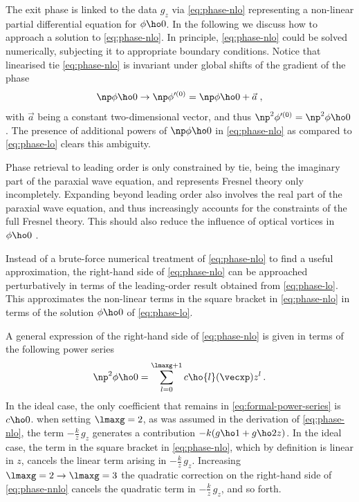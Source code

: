 \documentclass[
twoside,
openright,
titlepage,
numbers=noenddot,
headinclude,
fleqn,
a4paper,
footinclude=true,
cleardoublepage=empty,
abstractoff,
BCOR=5mm,
paper=a4,
fontsize=11pt,
british,ngerman,american,
]{scrreprt}
\begin{document}
The exit phase is linked to the data $g_z$ via \cref{eq:phase-nlo}
representing a non-linear partial differential equation for
$\phi\ho0$.  In the following we discuss how to approach a solution to
\cref{eq:phase-nlo}.  In principle, \cref{eq:phase-nlo} could be
solved numerically, subjecting it to appropriate boundary conditions.
Notice that linearised \ac{tie} \eqref{eq:phase-nlo} is invariant
under global shifts of the gradient of the phase
\begin{equation}
  \label{eq:shift-of-grad-phase}
  \np\phi\ho0\to\np\phi'^{(0)} = \np\phi\ho0+\vec{a} \;,
\end{equation}
with $\vec{a}$ being a constant two-dimensional vector, and thus
$\np^2\phi'^{(0)} = \np^2\phi\ho0$.  The presence of additional powers
of $\np\phi\ho0$ in \cref{eq:phase-nlo} as compared to
\cref{eq:phase-lo} clears this ambiguity.

Phase retrieval to leading order is only constrained by \ac{tie},
being the imaginary part of the paraxial wave equation, and represents
Fresnel theory only incompletely.  Expanding beyond leading order also
involves the real part of the paraxial wave equation, and thus
increasingly accounts for the constraints of the full Fresnel theory.
This should also reduce the influence of optical vortices in
$\phi\ho0$ \cite{Gureyev1995,Paganin1998}.

Instead of a brute-force numerical treatment of \cref{eq:phase-nlo} to
find a useful approximation, the right-hand side of
\cref{eq:phase-nlo} can be approached perturbatively in terms of the
leading-order result obtained from \cref{eq:phase-lo}.  This
approximates the non-linear terms in the square bracket in
\cref{eq:phase-nlo}  in terms of the solution $\phi\ho0$ of
\cref{eq:phase-lo}.

A general expression of the right-hand side of \cref{eq:phase-nlo} is
given in terms of the following power series
\begin{equation}
  \label{eq:formal-power-series}
  \np^2\phi\ho0 = \sum_{l=0}^{\lmaxg+1} c\ho{l}(\vecxp) z^l \,.
\end{equation}
In the ideal case, the only coefficient that remains in
\cref{eq:formal-power-series} is $c\ho0$.  \Eg{} when setting
$\lmaxg=2$, as was assumed in the derivation of \cref{eq:phase-nlo},
the term $-\frac{k}{z}\,g_z$ generates a contribution $-k(g\ho1 +g\ho2
z)$.  In the ideal case, the term in the square bracket in
\cref{eq:phase-nlo}, which by definition is linear in $z$, cancels the
linear term arising in $-\frac{k}{z}\,g_z$.  Increasing $\lmaxg=2\to
\lmaxg=3$ the quadratic correction on the right-hand side of
\cref{eq:phase-nnlo} cancels the quadratic term in
$-\frac{k}{z}\,g_z$, and so forth.
\end{document}
